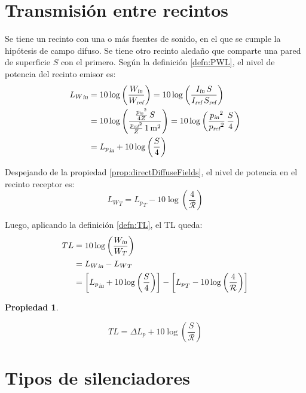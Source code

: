 \documentclass[a5paper,12pt,twoside]{book}
\newtheorem{prop}{{Propiedad}}[chapter]
\begin{document}
\section{Transmisión entre recintos}

Se tiene un recinto con una o más fuentes de sonido, en el que se cumple la hipótesis de campo difuso. Se tiene otro recinto aledaño que comparte una pared de superficie $S$ con el primero. Según la definición \ref{defn:PWL}, el nivel de potencia del recinto emisor es:
\begin{align*}
    {{L_W}_\textsl{{in}}}
    &= 10 \log \left( \frac{{{W}_\textsl{{in}}}}{{{W}_\textsl{{ref}}}} \right)
    = 10 \log \left( \frac{ {{I}_\textsl{{in}}} \, S }{ {{I}_\textsl{{ref}}} \, {{S}_\textsl{{ref}}} } \right)
    \\
    &= 10 \log \left( \frac{ \frac{{{p}_\textsl{{in}}}^2}{4Z} \, S }{ \frac{{{p}_\textsl{{ref}}}^2}{Z} \, 1\,\si{\metre^2} } \right)
    = 10 \log \left( \frac{{{p}_\textsl{{in}}}^2}{{{p}_\textsl{{ref}}}^2} \,  \frac{S}{4} \right)
    \\
    &= {{L_p}_\textsl{{in}}} + 10 \log \left( \frac{S}{4} \right)
\end{align*}

Despejando de la propiedad \ref{prop:directDiffuseFields}, el nivel de potencia en el recinto receptor es:
\begin{equation*}
    {L_W}_T = {L_p}_T - 10 \log \left( \frac{4}{\mathcal{R}} \right)
\end{equation*}

Luego, aplicando la definición \ref{defn:TL}, el TL queda:
\begin{align*}
    TL &=
    10 \log \left( \frac{{{W}_\textsl{{in}}}}{W_T} \right)
    \\
    &= {{L_W}_\textsl{{in}}} - {L_W}_T
    \\
    &= \left[ {{L_p}_\textsl{{in}}} + 10 \log \left( \frac{S}{4} \right) \right] - \left[ {L_p}_T - 10 \log \left( \frac{4}{\mathcal{R}} \right) \right]
\end{align*}

\begin{mdframed}[style=MyFrame1]
    \begin{prop}
    \end{prop}
    \begin{equation*}
        TL = \Delta L_p + 10 \log \left( \frac{S}{\mathcal{R}} \right)
    \end{equation*}
\end{mdframed}


\section{Tipos de silenciadores}
\end{document}
